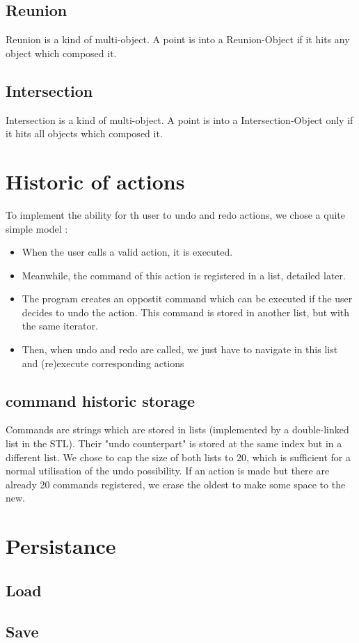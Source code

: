 \documentclass[a4paper, 12pts]{article}
\begin{document}
    \subsection{Reunion}
        Reunion is a kind of multi-object. A point is into a Reunion-Object if it hits any object which composed it.
    \subsection{Intersection}
        Intersection is a kind of multi-object. A point is into a Intersection-Object only if it hits all objects which composed it.

\section{Historic of actions}
    To implement the ability for th user to undo and redo actions, we chose a quite simple model :
    \begin{itemize}
        \item When the user calls a valid action, it is executed.
        \item Meanwhile, the command of this action is registered in a list, detailed later.
        \item The program creates an oppostit command which can be executed if the user decides to undo the action.
        This command is stored in another list, but with the same iterator.
        \item Then, when undo and redo are called, we just have to navigate in this list and (re)execute corresponding
        actions
    \end{itemize}

    \subsection{command historic storage}
        Commands are strings which are stored in lists (implemented by a double-linked list in the STL). Their "undo
        counterpart" is stored at the same index but in a different list. We chose to cap the size of both lists to 20,
        which is sufficient for a normal utilisation of the undo possibility. If an action is made but there are
        already 20 commands registered, we erase the oldest to make some space to the new.

\section{Persistance}
    \subsection{Load}
    \subsection{Save}
\end{document}
